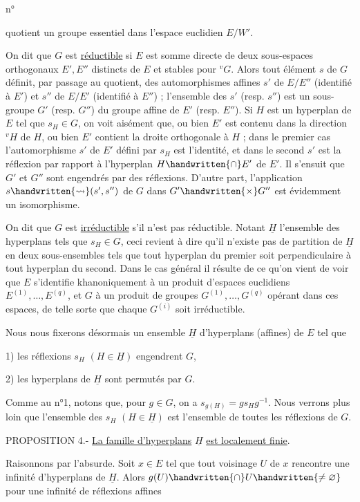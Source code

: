 \begin{flushright}n° \end{flushright}
quotient un groupe essentiel dans l'espace euclidien $E/W'$.

On dit que $G$ est \uline{réductible} si $E$ est somme directe de deux sous-espaces orthogonaux $E',E''$ distincts de $E$ et stables pour ${}^vG$. Alors tout élément $s$ de $G$ définit, par passage au quotient, des automorphismes affines $s'$ de $E/E''$ (identifié à $E'$) et $s''$ de $E/E'$ (identifié à $E''$) ; l'ensemble des $s'$ (resp. $s''$) est un sous-groupe $G'$ (resp. $G''$) du groupe affine de $E'$ (resp. $E''$). Si $H$ est un hyperplan de $E$ tel que $s_H\in G$, on voit aisément que, ou bien $E'$ est contenu dans la direction ${}^vH$ de $H$, ou bien $E'$ contient la droite orthogonale à $H$ ; dans le premier cas l'automorphisme $s'$ de $E'$ défini par $s_H$ est l'identité, et dans le second $s'$ est la réflexion par rapport à l'hyperplan $H\handwritten{\cap}E'$ de $E'$. Il s'ensuit que $G'$ et $G''$ sont engendrés par des réflexions. D'autre part, l'application $s\handwritten{\rightsquigarrow}(s',s'')$ de $G$ dans $G'\handwritten{\times}G''$ est évidemment un isomorphisme.

On dit que $G$ est \uline{irréductible} s'il n'est pas réductible. Notant $\underline{H}$ l'ensemble des hyperplans tels que $s_H\in G$, ceci revient à dire qu'il n'existe pas de partition de $\underline{H}$ en deux sous-ensembles tels que tout hyperplan du premier soit perpendiculaire à tout hyperplan du second. Dans le cas général il résulte de ce qu'on vient de voir que $E$ s'identifie khanoniquement à un produit d'espaces euclidiens $E^{(1)},\ldots,E^{(q)}$, et $G$ à un produit de groupes $G^{(1)},\ldots,G^{(q)}$ opérant dans ces espaces, de telle sorte que chaque $G^{(i)}$ soit irréductible.

Nous nous fixerons désormais un ensemble $\underline{H}$ d'hyperplans (affines) de $E$ tel que

1) les réflexions $s_H$ $(H\in\underline{H})$ engendrent $G$,

2) les hyperplans de $\underline{H}$ sont permutés par $G$.

Comme au n°1, notons que, pour $g\in G$, on a $s_{g(H)}=gs_Hg^{-1}$. Nous verrons plus loin que l'ensemble des $s_H$ $(H\in\underline{H})$ est l'ensemble de toutes les réflexions de $G$.

PROPOSITION 4.- \uline{La famille d'hyperplans} $\underline{H}$ \uline{est localement finie}.

Raisonnons par l'absurde. Soit $x\in E$ tel que tout voisinage $U$ de $x$ rencontre une infinité d'hyperplans de $\underline{H}$. Alors $g(U)\handwritten{\cap}U\handwritten{\ne\varnothing}$ pour une infinité de réflexions affines
